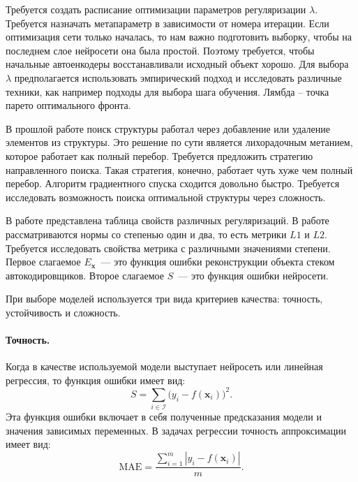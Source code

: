 \documentclass[12pt, twoside]{article}
\newcommand{\xb}{{\mathbf{x}}}
\newenvironment{comment}{}{}
\begin{document}
\begin{comment}
Требуется создать расписание оптимизации параметров регуляризации $\lambda$. Требуется назначать метапараметр в зависимости от номера итерации. Если оптимизация сети только началась, то нам важно подготовить выборку, чтобы на последнем слое нейросети она была простой. Поэтому требуется, чтобы начальные автоенкодеры восстанавливали исходный объект хорошо. Для выбора $\lambda$ предполагается использовать эмпирический подход и исследовать различные техники, как например подходы для выбора шага обучения. Лямбда – точка парето оптимального фронта.

В прошлой работе поиск структуры работал через добавление или удаление элементов из структуры. Это решение по сути является лихорадочным метанием, которое работает как полный перебор. Требуется предложить стратегию направленного поиска. Такая стратегия, конечно, работает чуть хуже чем полный перебор. 
Алгоритм градиентного спуска сходится довольно быстро. Требуется исследовать возможность поиска оптимальной структуры через сложность. 




В работе \cite{bib_1} представлена таблица свойств различных регуляризаций. В работе рассматриваются нормы со степенью один и два, то есть метрики $L1$ и $L2$. Требуется исследовать свойства метрика с различными значениями степени. 
Первое слагаемое $E_{\textbf{x}}$~--- это функция ошибки реконструкции объекта стеком автокодировщиков. Второе слагаемое $S$~--- это функция ошибки нейросети.

При выборе моделей используется три вида критериев качества: точность, устойчивость и сложность.

\paragraph{Точность.}

Когда в качестве используемой модели выступает нейросеть или линейная регрессия, 
то функция ошибки имеет вид:
\begin{equation}\label{eq3}
S = \sum_{i\in\mathcal{I}}\big(y_i-f(\xb_i)\big)^2.
\end{equation}
Эта функция ошибки включает в себя полученные предсказания модели и значения зависимых переменных. В задачах регрессии точность аппроксимации имеет вид: 
\begin{equation}\label{eq106}
\text{MAE} =\frac{ \sum\limits_{i=1}^m|y_i-f(\xb_i)|}{m}.
\end{equation}


\end{comment}
\end{document}

